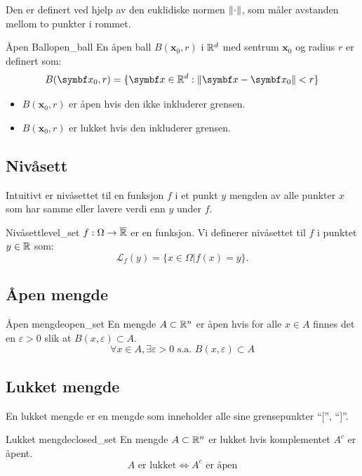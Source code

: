 Den er definert ved hjelp av den euklidiske normen \(\lVert\cdot\rVert\), som måler avstanden mellom to punkter i rommet.

\begin{definition}{Åpen Ball}{open_ball}
	En åpen ball \(B(\mathbf{x}_0, r)\) i \(\mathbb{R}^d\) med sentrum \(\mathbf{x}_0\) og radius \(r\) er definert som:
	\[
		B(\mathbf{x}_0, r) = \{ \mathbf{x} \in \R^d : \norm{\mathbf{x} - \mathbf{x}_0} < r\}
	\]
	\begin{itemize}
		\item \(B(\mathbf{x}_0, r)\) er åpen hvis den ikke inkluderer grensen.
		\item \(B(\mathbf{x}_0, r)\) er lukket hvis den inkluderer grensen.
	\end{itemize}
\end{definition}

\subsection{Nivåsett}
Intuitivt er nivåsettet til en funksjon \( f \) i et punkt \( y \) mengden av alle punkter \( x \) som har samme eller lavere verdi enn \( y \) under \( f \).
\begin{definition}{Nivåsett}{level_set}
	\(f: \Omega \to \overline{\mathbb{R}}\) er en funksjon. Vi definerer nivåsettet til \(f\) i punktet \(y \in \mathbb{R}\) som:
	\[
		\mathcal{L}_f(y) = \{x \in \Omega | f(x) = y\}.
	\]
\end{definition}

\subsection{Åpen mengde}

\begin{definition}{Åpen mengde}{open_set}
	En mengde \(A \subset \mathbb{R}^n\) er åpen hvis for alle \(x \in A\) finnes det en \(\varepsilon > 0\) slik at \(B(x, \varepsilon) \subset A\).
	\[
		\forall x \in A, \exists \varepsilon > 0 \text{ s.a. } B(x, \varepsilon) \subset A
	\]
\end{definition}

\subsection{Lukket mengde}
En lukket mengde er en mengde som inneholder alle sine grensepunkter \enquote{$[$}, \enquote{$]$}.
\begin{definition}{Lukket mengde}{closed_set}
	En mengde \(A \subset \mathbb{R}^n\) er lukket hvis komplementet \(A^c\) er åpent.
	\[
		A \text{ er lukket} \Leftrightarrow A^c \text{ er åpen}
	\]
\end{definition}

